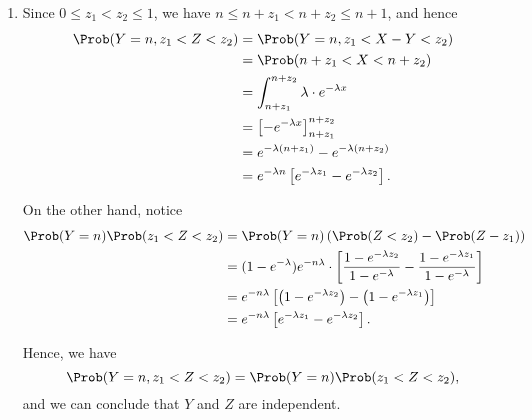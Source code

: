 \begin{enumerate}
    \item Since \(0 \leq z_1 < z_2 \leq 1\), we have \(n \leq n + z_1 < n + z_2 \leq n + 1\), and hence
          \begin{align*}
              \Prob(Y = n, z_1 < Z < z_2) & = \Prob(Y = n, z_1 < X - Y < z_2)                                  \\
                                          & = \Prob(n + z_1 < X < n + z_2)                                     \\
                                          & = \int_{n + z_1}^{n + z_2} \lambda \cdot e^{-\lambda x}            \\
                                          & = \left[- e^{-\lambda x}\right]_{n + z_1}^{n + z_2}                \\
                                          & = e^{-\lambda (n + z_1)} - e^{-\lambda (n + z_2)}                  \\
                                          & = e^{-\lambda n} \left[e^{-\lambda z_1} - e^{-\lambda z_2}\right].
          \end{align*}

          On the other hand, notice
          \begin{align*}
              \Prob(Y = n) \Prob(z_1 < Z < z_2) & = \Prob(Y = n) \left(\Prob(Z < z_2) - \Prob(Z - z_1)\right)                                                                                          \\
                                                & = (1 - e^{-\lambda}) e^{-n\lambda} \cdot \left[\frac{1 - e^{-\lambda z_2}}{1 - e^{-\lambda}} -  \frac{1 - e^{-\lambda z_1}}{1 - e^{-\lambda}}\right] \\
                                                & = e^{- n \lambda} \left[\left(1 - e^{-\lambda z_2}\right) - \left(1 - e^{-\lambda z_1}\right)\right]                                                 \\
                                                & = e^{-n \lambda} \left[e^{-\lambda z_1} - e^{-\lambda z_2}\right].
          \end{align*}

          Hence, we have
          \[
              \Prob(Y = n, z_1 < Z < z_2) = \Prob(Y = n) \Prob(z_1 < Z < z_2),
          \]
          and we can conclude that \(Y\) and \(Z\) are independent.
\end{enumerate}
